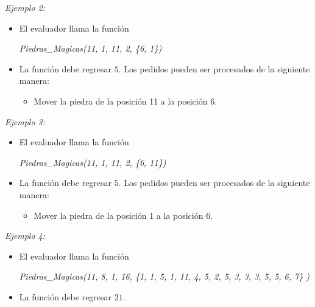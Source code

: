 \documentclass[12pt]{scrartcl}
\begin{document}
        {\itshape Ejemplo 2:}
        \begin{itemize}
            \item El evaluador llama la función 
            \begin{center}
                \textit{Piedras\_Magicas(11, 1, 11, 2, \{6, 1\})}
            \end{center}
            
            \item La función debe regresar $5$. Los pedidos pueden ser procesados de la siguiente manera:
            \begin{itemize}
                \item Mover la piedra de la posición 11 a la posición 6.
            \end{itemize}
        \end{itemize}
        
        {\itshape Ejemplo 3:}
        \begin{itemize}
            \item El evaluador llama la función 
            \begin{center}
                \textit{Piedras\_Magicas(11, 1, 11, 2, \{6, 11\})}
            \end{center}
            
            \item La función debe regresar $5$. Los pedidos pueden ser procesados de la siguiente manera:
            \begin{itemize}
                \item Mover la piedra de la posición 1 a la posición 6.
            \end{itemize}
        \end{itemize}
        
        {\itshape Ejemplo 4:}
        \begin{itemize}
            \item El evaluador llama la función 

            \begin{center}
            \textit{Piedras\_Magicas(11, 8, 1, 16, \{1, 1, 5, 1, 11, 4, 5, 2, 5, 3, 3, 3, 5, 5, 6, 7\} )}
            \end{center}
            
            \item La función debe regresar $21$.
        \end{itemize}
        
\end{document}

